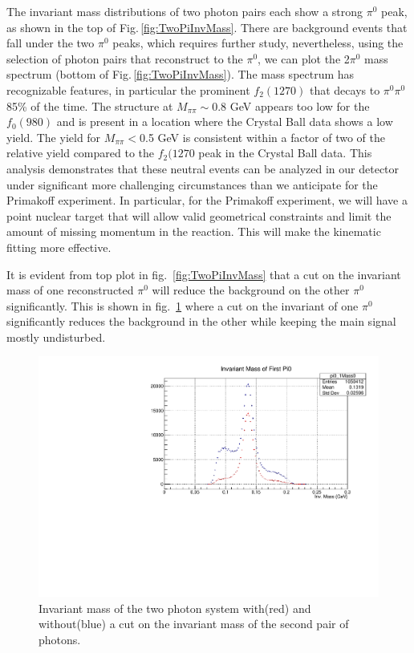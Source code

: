 The invariant mass distributions of two photon pairs each show a
strong $\pi^0$ peak, as shown in the top of
Fig.\,\ref{fig:TwoPiInvMass}. There are background events that fall
under the two $\pi^0$ peaks, which requires further study,
nevertheless, using the selection of photon pairs that reconstruct to
the $\pi^0$, we can plot the 2$\pi^0$ mass spectrum (bottom of
Fig.\,\ref{fig:TwoPiInvMass}). The mass spectrum has recognizable
features, in particular the prominent $f_2(1270)$ that decays to
$\pi^0\pi^0$ 85\% of the time. The structure at $M_{\pi\pi}\sim$0.8
GeV appears too low for the $f_0(980)$ and is present in a location
where the Crystal Ball data \cite{Marsiske:1990hx} shows a low
yield. The yield for $M_{\pi\pi}<$0.5 GeV is consistent within a
factor of two of the relative yield compared to the $f_2(1270$ peak in
the Crystal Ball data. This analysis demonstrates that these neutral
events can be analyzed in our detector under significant more
challenging circumstances than we anticipate for the Primakoff
experiment. In particular, for the Primakoff experiment, we will have
a point nuclear target that will allow valid geometrical constraints
and limit the amount of missing momentum in the reaction. This will
make the kinematic fitting more effective.

It is evident from top plot in fig.~\ref{fig:TwoPiInvMass} that a cut
on the invariant mass of one reconstructed $\pi^{0}$ will reduce the
background on the other $\pi^{0}$ significantly. This is shown in
fig.~\ref{fig:pi0yield} where a cut on the invariant of one $\pi^{0}$
significantly reduces the background in the other while keeping the
main signal mostly undisturbed.
\begin{figure}[htp]
\centering\includegraphics[width=4.75in]{figures/pi0_inv_mass_withpi02cut.pdf}
\caption{Invariant mass of the two photon system with(red) and without(blue) a cut on the invariant mass of the second pair of photons.
\label{fig:pi0yield}}
\end{figure}

